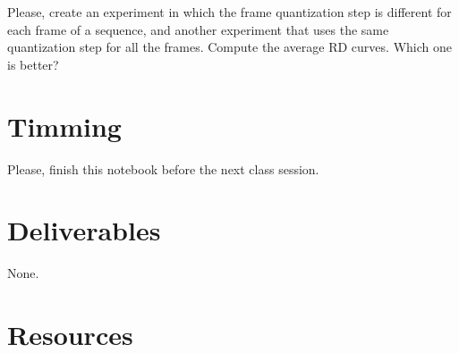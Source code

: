Please, create an experiment in which the frame quantization step is
different for each frame of a sequence, and another experiment that
uses the same quantization step for all the frames. Compute the
average RD curves. Which one is better?


\section{Timming}

Please, finish this notebook before the next class session.

\section{Deliverables}

None.

\section{Resources}


